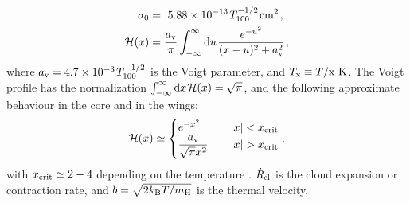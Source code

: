 \documentclass[fleqn,usenatbib]{mnras}
\begin{document}
\begin{align}
    \sigma_0 &=~ 5.88 \times 10^{-13} \hspace{1 pt} T_{100}^{-1/2} \hspace{1 pt} \rm cm^2 \hspace{1 pt} \label{sigma0 definition}, \\ \mathcal{H}(x) &= \dfrac{a_{\rm v}}{\pi} \int_{-\infty}^{\infty} \textrm{d}u \hspace{1 pt} \dfrac{e^{-u^2}}{(x-u)^2 + a_{\rm v}^2} \hspace{ 1 pt} , \label{Voigt definition}
\end{align}
where $a_{\rm v} = 4.7 \times 10^{-3} \hspace{1 pt} T_{100}^{-1/2}$ is the Voigt parameter, and $T_{\rm x} \equiv T/\rm x ~ \rm K$. The Voigt profile has the normalization $\int_{-\infty}^{\infty} \textrm{d}x \hspace{1 pt} \mathcal{H}(x) = \sqrt{\pi}$, and the following approximate behaviour in the core and in the wings:
\begin{align}
    \mathcal{H}(x) \simeq \begin{cases}
        e^{-x^2} & \quad \lvert x \rvert < x_{\rm crit} \\ \dfrac{a_{\rm v}}{\sqrt{\pi} x^2} & \quad \lvert x \rvert > x_{\rm crit} 
    \end{cases} \label{VoigtApprox},
\end{align}
with $x_{\rm crit} \simeq 2-4$ depending on the temperature \citep[see e.g. fig. 1 in][]{Smith2015}. $\Dot{R}_{\rm cl}$ is the cloud expansion or contraction rate, and $b = \sqrt{2 k_{\rm B}T/m_{\rm H}}$ is the thermal velocity. 
\end{document}
